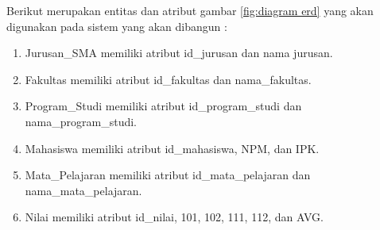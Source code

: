 Berikut merupakan entitas dan atribut gambar \ref{fig:diagram erd} yang akan digunakan pada sistem yang akan dibangun :

\begin{enumerate}
    \item Jurusan\_SMA memiliki atribut id\_jurusan dan nama jurusan.
    
    \item Fakultas memiliki atribut id\_fakultas dan nama\_fakultas.
    
    \item Program\_Studi memiliki atribut id\_program\_studi dan nama\_program\_studi.
    
    \item Mahasiswa memiliki atribut id\_mahasiswa, NPM, dan IPK.
    
    \item Mata\_Pelajaran memiliki atribut id\_mata\_pelajaran dan nama\_mata\_pelajaran.
    
    \item Nilai memiliki atribut id\_nilai, 101, 102, 111, 112, dan AVG. 
\end{enumerate}




